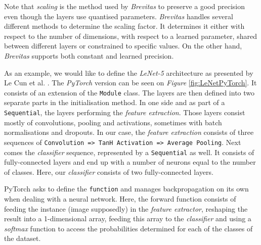Note that \emph{scaling} is the method used by \emph{Brevitas} to preserve a good precision even though the layers use quantised parameters. \emph{Brevitas} handles several different methods to determine the scaling factor. It determines it either with respect to the number of dimensions, with respect to a learned parameter, shared between different layers or constrained to specific values. On the other hand, \emph{Brevitas} supports both constant and learned precision.

As an example, we would like to define the \emph{LeNet-5} architecture as presented by Le Cun et al. \cite{LeCun1998}. The \emph{PyTorch} version can be seen on \emph{Figure} \ref{fig:LeNetPyTorch}. It consists of an extension of the \texttt{Module} class. The layers are then defined into two separate parts in the initialisation method. In one side and as part of a \texttt{Sequential}, the layers performing the \emph{feature extraction}. Those layers consist mostly of convolutions, pooling and activations, sometimes with batch normalisations and dropouts. In our case, the \emph{feature extraction} consists of three sequences of \texttt{Convolution => TanH Activation => Average Pooling}. Next comes the \emph{classifier} sequence, represented by a \texttt{Sequential} as well. It consists of fully-connected layers and end up with a number of neurons equal to the number of classes. Here, our \emph{classifier} consists of two fully-connected layers.

PyTorch asks to define the \texttt{function} and manages backpropagation on its own when dealing with a neural network. Here, the forward function consists of feeding the instance (image supposedly) in the \emph{feature extractor}, reshaping the result into a 1-dimensional array, feeding this array to the \emph{classifier} and using a \emph{softmax} function to access the probabilities determined for each of the classes of the dataset.


